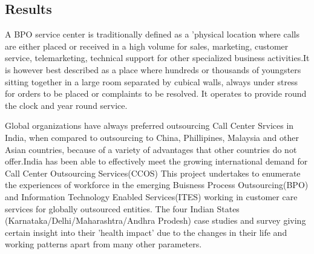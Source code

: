 \subsection{Results}

A BPO service center is traditionally defined as a 'physical location where calls are either placed or received in a high volume for sales, marketing, customer service, telemarketing, technical support for other specialized business activities.It is however best described as a place where hundreds or thousands of youngsters sitting together in a large room separated by cubical walls, always under stress for orders to be placed or complaints to be resolved. It operates to provide round the clock and year round service.

Global organizations have always preferred outsourcing Call Center Srvices in India, when compared to outsourcing to China, Phillipines, Malaysia and other Asian countries, because of a variety of advantages that other countries do not offer.India has been able to effectively meet the growing international demand for Call Center Outsourcing Services(CCOS)   
This project undertakes to enumerate the experiences of workforce in the emerging Buisness Process Outsourcing(BPO) and Information Technology Enabled Services(ITES) working in customer care services for globally outsourced entities. The four Indian States (Karnataka/Delhi/Maharashtra/Andhra Prodesh) case studies and survey giving certain insight into their 'health impact' due to the changes in their life and working patterns apart from many other parameters.